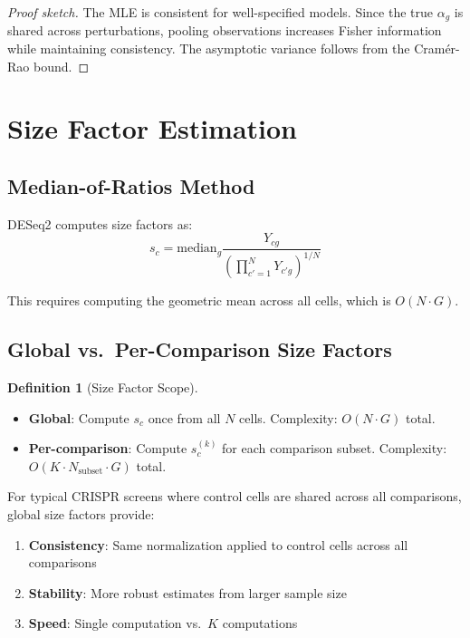 \documentclass[11pt]{article}
\theoremstyle{definition}
\newtheorem{definition}{Definition}
\theoremstyle{remark}
\begin{document}
\begin{proof}[Proof sketch]
The MLE is consistent for well-specified models. Since the true $\alpha_g$ is shared across perturbations, pooling observations increases Fisher information while maintaining consistency. The asymptotic variance follows from the Cramér-Rao bound.
\end{proof}

\section{Size Factor Estimation}

\subsection{Median-of-Ratios Method}

DESeq2 computes size factors as:
\begin{equation}
s_c = \text{median}_g \frac{Y_{cg}}{\left(\prod_{c'=1}^{N} Y_{c'g}\right)^{1/N}}
\end{equation}

This requires computing the geometric mean across all cells, which is $O(N \cdot G)$.

\subsection{Global vs.\ Per-Comparison Size Factors}

\begin{definition}[Size Factor Scope]
\begin{itemize}
    \item \textbf{Global}: Compute $s_c$ once from all $N$ cells. Complexity: $O(N \cdot G)$ total.
    \item \textbf{Per-comparison}: Compute $s_c^{(k)}$ for each comparison subset. Complexity: $O(K \cdot N_{\text{subset}} \cdot G)$ total.
\end{itemize}
\end{definition}

For typical CRISPR screens where control cells are shared across all comparisons, global size factors provide:
\begin{enumerate}
    \item \textbf{Consistency}: Same normalization applied to control cells across all comparisons
    \item \textbf{Stability}: More robust estimates from larger sample size
    \item \textbf{Speed}: Single computation vs.\ $K$ computations
\end{enumerate}
\end{document}
